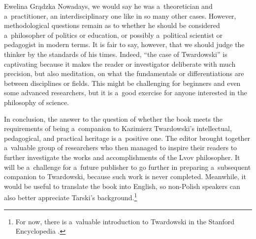 \begin{newrevengenv}{Ewelina Grądzka}
Nowadays, we would say he was a~theoretician and a~practitioner, an interdisciplinary one like in so many other cases. However, methodological questions remain as to whether he should be considered a~philosopher of politics or education, or possibly a~political scientist or pedagogist in modern terms. It is fair to say, however, that we should judge the thinker by the standards of his times. Indeed, ``the case of Twardowski'' is captivating because it makes the reader or investigator deliberate with much precision, but also meditation, on what the fundamentals or differentiations are between disciplines or fields. This might be challenging for beginners and even some advanced researchers, but it is a~good exercise for anyone interested in the philosophy of science.

In conclusion, the answer to the question of whether the book meets the requirements of being a~companion to Kazimierz Twardowski's intellectual, pedagogical, and practical heritage is a~positive one. The editor brought together a~valuable group of researchers who then managed to inspire their readers to further investigate the works and accomplishments of the Lvov philosopher. It will be a~challenge for a~future publisher to go further in preparing a~subsequent companion to Twardowski, because such work is never completed. Meanwhile, it would be useful to translate the book into English, so non-Polish speakers can also better appreciate Tarski's background.\footnote{For now, there is a~valuable introduction to Twardowski in the Stanford Encyclopedia
\parencite{betti_kazimierz_2019}.
}








\end{newrevengenv}
